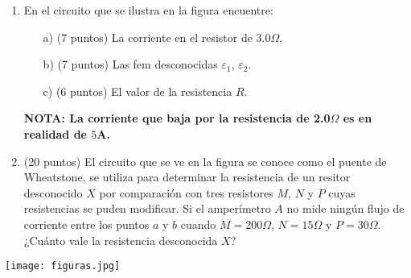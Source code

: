 \documentclass{article}
\begin{document}
\begin{enumerate}
\item  En el circuito que se ilustra en la figura
  encuentre:

\begin{enumerate}
\item[a)] (7 puntos) La corriente en el resistor de 3.0$\Omega$. 
\item[b)] (7 puntos) Las fem desconocidas $\varepsilon_1$, $\varepsilon_2$.
\item[c)] (6 puntos) El valor de la resistencia $R$. 
\end{enumerate}
{\bf NOTA: La corriente que baja por la resistencia de 2.0$\Omega$ es en realidad de $5$A.}

\item (20 puntos) El circuito que se ve en la figura se conoce
  como el puente de Wheatstone, se utiliza para determinar la
  resistencia de un  resitor desconocido $X$ por comparaci\'on con
  tres resistores $M$,   $N$ y $P$ cuyas resistencias se puden
  modificar. Si el amper\'imetro $A$ no mide ning\'un flujo de
  corriente entre los puntos $a$ y $b$   cuando $M=200\Omega$,
  $N=15\Omega$ y $P=30\Omega$. ¿Cuánto vale la resistencia
  desconocida $X$?  
\end{enumerate}

\begin{center}
\texttt{[image: figuras.jpg]}
\end{center}
\end{document}
